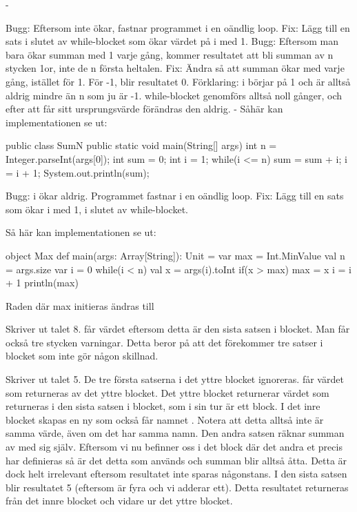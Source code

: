 \Subtask -

\Task 

\Subtask Bugg: Eftersom  inte ökar, fastnar programmet i en oändlig loop. Fix: Lägg till en sats i slutet av while-blocket som ökar värdet på i med 1.
Bugg: Eftersom man bara ökar summan med 1 varje gång, kommer resultatet att bli summan av n stycken 1or, inte de n första heltalen. Fix: Ändra så att summan ökar med  varje gång, istället för 1.
För -1, blir resultatet 0. Förklaring: i börjar på 1 och är alltså aldrig mindre än n som ju är -1. while-blocket genomförs alltså noll gånger, och efter att  får sitt ursprungsvärde förändras den aldrig.
\Subtask -
\Subtask Såhär kan implementationen se ut:
\begin{Code}
public class SumN {
  public static void main(String[] args) {
    int n = Integer.parseInt(args[0]);
    int sum = 0;
    int i = 1;
    while(i <= n){
      sum = sum + i;
      i = i + 1;
      }
    }
    System.out.println(sum);
}
\end{Code}

\Task 

\Subtask Bugg: i ökar aldrig. Programmet fastnar i en oändlig loop. Fix: Lägg till en sats som ökar i med 1, i slutet av while-blocket.

\Subtask Så här kan implementationen se ut:
\begin{Code}
object Max {
  def main(args: Array[String]): Unit = {
    var max = Int.MinValue
    val n = args.size
    var i = 0
    while(i < n) {
      val x = args(i).toInt
      if(x > max) {
        max = x
      }
      i = i + 1
    }
    println(max)
  }
}
\end{Code}
\Subtask Raden där max initieras ändras till  

\Subtask {}

\Task

\Subtask Skriver ut talet 8.  får värdet  eftersom detta är den sista satsen i blocket. Man får också tre stycken varningar. Detta beror på att det förekommer tre satser i blocket som inte gör någon skillnad.

\Subtask Skriver ut talet 5. De tre första satserna i det yttre blocket ignoreras.  får värdet som returneras av det yttre blocket. Det yttre blocket returnerar värdet som returneras i den sista satsen i blocket, som i sin tur är ett block. I det inre blocket skapas en ny  som också får namnet . Notera att detta alltså inte är samma värde, även om det har samma namn. Den andra satsen räknar summan av  med sig själv. Eftersom vi nu befinner oss i det block där det andra et precis har definieras så är det detta  som används och summan blir alltså åtta. Detta är dock helt irrelevant eftersom resultatet inte sparas någonstans. I den sista satsen blir resultatet 5 (eftersom  är fyra och vi adderar ett). Detta resultatet returneras från det innre blocket och vidare ur det yttre blocket.

